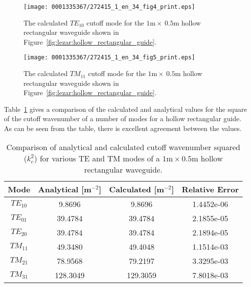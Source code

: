\begin{figure}[!b]
\vspace*{-4pt}
\centering
\texttt{[image: 0001335367/272415\_1\_en\_34\_fig4\_print.eps]}
\caption{The calculated $TE_{10}$ cutoff mode for the
$1\text{m}\times~0.5\text{m}$ hollow rectangular waveguide shown in
Figure~\ref{fig:lezar:hollow_rectangular_guide}.}
\label{fig:lezar:rectangular_cutoff_TE}\vspace*{6pt}
\end{figure}

\begin{figure}[!b]
\centering
\texttt{[image: 0001335367/272415\_1\_en\_34\_fig5\_print.eps]}
\caption{The calculated $TM_{11}$ cutoff mode for the
$1\text{m}\times~0.5\text{m}$ hollow rectangular waveguide shown in
Figure~\ref{fig:lezar:hollow_rectangular_guide}.}
\label{fig:lezar:rectangular_cutoff_TM}\vspace*{-4pt}
\end{figure}

Table~\ref{tab:lezar:rectangular_cutoff_comparison} gives a comparison
of the calculated and analytical values for the square of the cutoff
wavenumber of a number of modes for a hollow
rectangular guide. As can be seen from the table, there is excellent
agreement between the values.

\begin{table}[!t]
 \centering
\begin{tabular}{cccc}
      \toprule
      Mode & Analytical [m$^{-2}$] & Calculated [m$^{-2}$] & Relative Error \\
      \midrule
      $TE_{10}$ & 9.8696 & 9.8696 & 1.4452e-06\\
      $TE_{01}$ & 39.4784 & 39.4784 & 2.1855e-05\\
      $TE_{20}$ & 39.4784 & 39.4784 & 2.1894e-05\\
      \midrule
      $TM_{11}$ & 49.3480 & 49.4048 & 1.1514e-03 \\
      $TM_{21}$ & 78.9568 & 79.2197 & 3.3295e-03\\
      $TM_{31}$ & 128.3049 & 129.3059 & 7.8018e-03\\
      \bottomrule
\end{tabular}
\caption{Comparison of analytical and calculated cutoff wavenumber squared ($k_c^2$) for various TE and TM modes of a $1\text{m}\times0.5\text{m}$ hollow rectangular waveguide.}
\label{tab:lezar:rectangular_cutoff_comparison}\vspace*{8pt}
\end{table}

